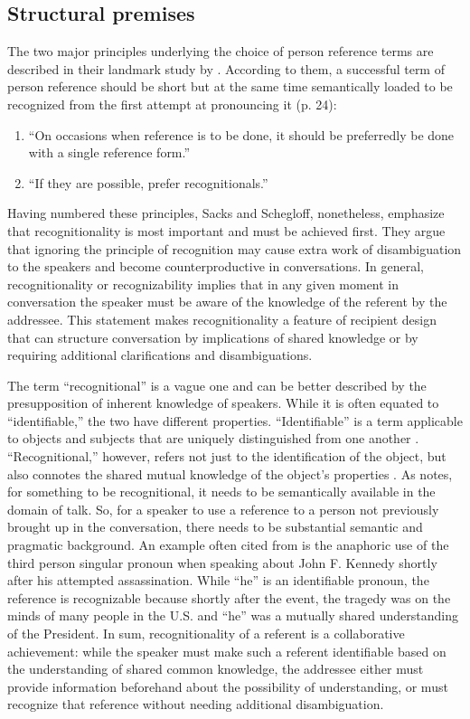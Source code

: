 \documentclass[12pt, draft]{article}
\begin{document}
\subsection{Structural premises}
The two major principles underlying the choice of person reference terms are described in their landmark study by \textcite{sacks1979}. According to them, a successful term of person reference should be short but at the same time semantically loaded to be recognized from the first attempt at pronouncing it (p. 24):
\begin{enumerate}
\item ``On occasions when reference is to be done, it should be preferredly be done with a single reference form.''
\item ``If they are possible, prefer recognitionals.''
\end{enumerate}
Having numbered these principles, Sacks and Schegloff, nonetheless, emphasize that recognitionality is most important and must be achieved first. They argue that ignoring the principle of recognition may cause extra work of disambiguation to the speakers and become counterproductive in conversations. In general, recognitionality or recognizability implies that in any given moment in conversation the speaker must be aware of the knowledge of the referent by the addressee. This statement makes recognitionality a feature of recipient design that can structure conversation by implications of shared knowledge or by requiring additional clarifications and disambiguations. 

The term ``recognitional'' is a vague one and can be better described by the presupposition of inherent knowledge of speakers. While it is often equated to ``identifiable,'' the two have different properties. ``Identifiable'' is a term applicable to objects and subjects that are uniquely distinguished from one another \parencite{clark1986, chafe1976}. ``Recognitional,'' however, refers not just to the identification of the object, but also connotes the shared mutual knowledge of the object’s properties \parencite{clark1986, defornel1987, sacks1979}. As \textcite{chafe1976} notes, for something to be recognitional, it needs to be semantically available in the domain of talk. So, for a speaker to use a reference to a person not previously brought up in the conversation, there needs to be substantial semantic and pragmatic background. An example often cited from \textcite{schegloff2007} is the anaphoric use of the third person singular pronoun when speaking about John F. Kennedy shortly after his attempted assassination. While ``he'' is an identifiable pronoun, the reference is recognizable because shortly after the event, the tragedy was on the minds of many people in the U.S. and ``he'' was a mutually shared understanding of the President. In sum, recognitionality of a referent is a collaborative achievement: while the speaker must make such a referent identifiable based on the understanding of shared common knowledge, the addressee either must provide information beforehand about the possibility of understanding, or must recognize that reference without needing additional disambiguation.
\end{document}
